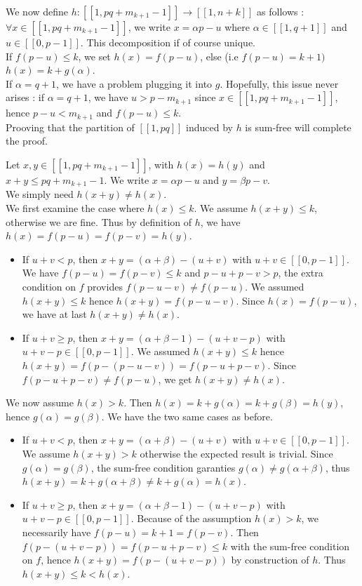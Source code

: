 We now define \(h : [\![1,pq+m_{k+1}-1]\!] \longrightarrow [\![1,n+k]\!] \) as follows :
\( \forall x \in [\![1,pq + m_{k+1}-1]\!] \), we write \(x = \alpha p - u\) where \(\alpha \in [\![1,q+1]\!] \) and \( u \in
[\![0,p-1]\!] \).
This decomposition if of course unique. \\
If \(f(p-u) \leqslant k\), we set \(h(x) = f(p-u)\), else (i.e \(f(p-u) = k + 1)\) \(h(x) = k + g(\alpha) \). \\
If \(\alpha = q+1\), we have a problem plugging it into \(g\). Hopefully, this issue never arises : if 
\(\alpha = q+1\), we have \(u > p - m_{k+1}\) since \(x \in [\![1,pq + m_{k+1}-1]\!]\), hence \(p-u < m_{k+1}\) and \(f(p-u) \leqslant k\). \\
Prooving that the partition of \([\![1,pq]\!]\) induced by \(h\) is sum-free will complete the proof.

Let \(x,y \in [\![1,pq + m_{k+1}-1]\!]\), with \(h(x) = h(y)\) and \(x+y \leqslant pq+m_{k+1}-1\). We write \(x = \alpha p - u\) and \(y =
\beta p - v\). \\
We simply need \(h(x+y) \neq h(x)\). \\

We first examine the case where \(h(x) \leqslant k\). We assume \(h(x+y) \leqslant k\), otherwise we are fine. 
Thus by definition of \(h\), we have \(h(x) = f(p-u) = f(p-v) = h(y)\).
\begin{itemize}
\item If \(u+v < p\), then \(x+y = (\alpha+\beta) - (u+v) \) with \(u+v \in [\![0,p-1]\!] \).
We have \(f(p-u) = f(p-v) \leqslant k\) and \(p-u + p-v > p\), the extra condition on \(f\) provides \(f(p-u-v) \neq
f(p-u)\).
We assumed \(h(x+y) \leqslant k\) hence \(h(x+y) = f(p-u-v)\). Since \(h(x) = f(p-u)\), we have at last \(h(x+y) \neq
h(x)\).
\item If \(u+v \geqslant p\), then \(x+y = (\alpha+\beta-1) - (u+v-p) \) with \(u+v-p \in [\![0,p-1]\!] \).
We assumed \(h(x+y) \leqslant k \) hence \(h(x+y) = f( p- (p-u-v)) = f(p-u + p-v)\). Since \(f(p-u+p-v) \neq f(p-u)\),
we get \(h(x+y) \neq h(x)\).
\end{itemize} 
  
We now assume \(h(x) > k\). Then \(h(x) = k + g(\alpha) = k + g(\beta) = h(y)\), hence \(g(\alpha) = g(\beta)\). 
We have the two same cases as before.

\begin{itemize}
\item If \(u+v < p\), then \(x+y = (\alpha+\beta) - (u+v) \) with \(u+v \in [\![0,p-1]\!] \).
We assume \(h(x+y) > k\) otherwise the expected result is trivial.
Since \(g(\alpha) = g(\beta)\), the sum-free condition garanties \(g(\alpha) \neq g(\alpha+\beta)\), 
thus \(h(x+y) = k + g(\alpha + \beta) \neq k + g(\alpha) = h(x)\).
\item If \(u+v \geqslant p\), then \(x+y = (\alpha+\beta-1) - (u+v-p) \) with \(u+v-p \in [\![0,p-1]\!] \).
Because of the assumption \(h(x) > k\), we necessarily have \(f(p-u) = k+1 = f(p-v)\). 
Then \(f(p-(u+v-p)) = f(p-u + p-v) \leqslant k \) with the sum-free condition on \(f\), 
hence \(h(x+y) = f(p-(u+v-p)) \) by construction of \(h\). Thus \(h(x+y) \leqslant k < h(x)\).
\end{itemize}


